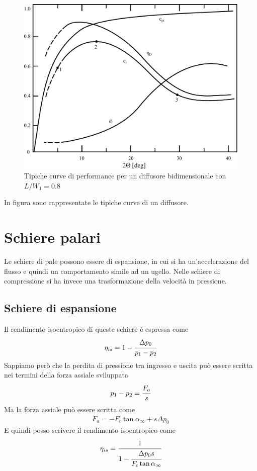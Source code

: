 \begin{figure}
\centering
  \includegraphics[width=.5\textwidth]{fig/DiffPerf.pdf}
\caption{Tipiche curve di performance per un diffusore bidimensionale con $L/W_1 = 0.8$}
\label{fig:DiffPerf}
\end{figure}
In figura sono rappresentate le tipiche curve di un diffusore.

\section{Schiere palari}
Le schiere di pale possono essere di espansione, in cui si ha un'accelerazione del flusso e quindi un comportamento simile ad un ugello. Nelle schiere di compressione si ha invece una trasformazione della velocità in pressione. 

\subsection{Schiere di espansione}
Il rendimento isoentropico di queste schiere è espressa come 
\begin{align*}
\eta_{is} = 1- \cfrac{\Delta p_0}{p_1 - p_2}
\end{align*}
Sappiamo però che la perdita di pressione tra ingresso e uscita può essere scritta nei termini della forza assiale sviluppata
\begin{align*}
p_1-p_2 = \cfrac{F_a}{s}
\end{align*}
Ma la forza assiale può essere scritta come
\begin{align*}
F_a=  - F_t \tan \alpha_{\infty} + s \Delta p_0
\end{align*}
E quindi posso scrivere il rendimento isoentropico come
\begin{align*}
\eta_{is} = \cfrac{1}{1- \cfrac{\Delta p_0 s}{F_t \tan \alpha_{\infty}}}
\end{align*}
